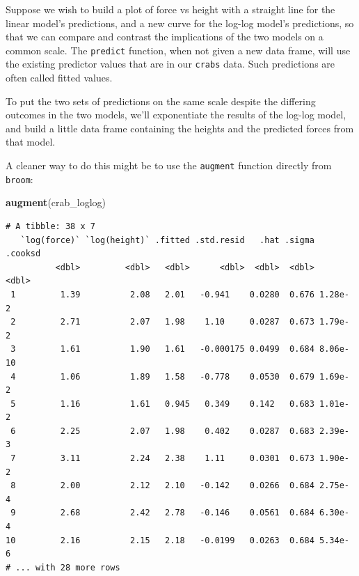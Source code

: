 \documentclass[
]{book}
\newenvironment{Shaded}{\begin{snugshade}}{\end{snugshade}}
\newcommand{\DataTypeTok}[1]{\textcolor[rgb]{0.13,0.29,0.53}{#1}}
\newcommand{\KeywordTok}[1]{\textcolor[rgb]{0.13,0.29,0.53}{\textbf{#1}}}
\newcommand{\NormalTok}[1]{#1}
\newcommand{\OperatorTok}[1]{\textcolor[rgb]{0.81,0.36,0.00}{\textbf{#1}}}
\newcommand{\StringTok}[1]{\textcolor[rgb]{0.31,0.60,0.02}{#1}}
\begin{document}
Suppose we wish to build a plot of force vs height with a straight line for the linear model's predictions, and a new curve for the log-log model's predictions, so that we can compare and contrast the implications of the two models on a common scale. The \texttt{predict} function, when not given a new data frame, will use the existing predictor values that are in our \texttt{crabs} data. Such predictions are often called fitted values.

To put the two sets of predictions on the same scale despite the differing outcomes in the two models, we'll exponentiate the results of the log-log model, and build a little data frame containing the heights and the predicted forces from that model.

\begin{Shaded}
\end{Shaded}

A cleaner way to do this might be to use the \texttt{augment} function directly from \texttt{broom}:

\begin{Shaded}
\begin{Highlighting}[]
\KeywordTok{augment}\NormalTok{(crab_loglog)}
\end{Highlighting}
\end{Shaded}

\begin{verbatim}
# A tibble: 38 x 7
   `log(force)` `log(height)` .fitted .std.resid   .hat .sigma  .cooksd
          <dbl>         <dbl>   <dbl>      <dbl>  <dbl>  <dbl>    <dbl>
 1         1.39          2.08   2.01   -0.941    0.0280  0.676 1.28e- 2
 2         2.71          2.07   1.98    1.10     0.0287  0.673 1.79e- 2
 3         1.61          1.90   1.61   -0.000175 0.0499  0.684 8.06e-10
 4         1.06          1.89   1.58   -0.778    0.0530  0.679 1.69e- 2
 5         1.16          1.61   0.945   0.349    0.142   0.683 1.01e- 2
 6         2.25          2.07   1.98    0.402    0.0287  0.683 2.39e- 3
 7         3.11          2.24   2.38    1.11     0.0301  0.673 1.90e- 2
 8         2.00          2.12   2.10   -0.142    0.0266  0.684 2.75e- 4
 9         2.68          2.42   2.78   -0.146    0.0561  0.684 6.30e- 4
10         2.16          2.15   2.18   -0.0199   0.0263  0.684 5.34e- 6
# ... with 28 more rows
\end{verbatim}
\end{document}
